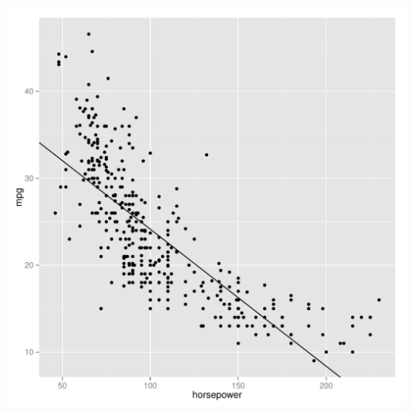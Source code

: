\documentclass{article}\usepackage[]{graphicx}\usepackage[]{color}
\makeatletter
\def\maxwidth{ %
  \ifdim\Gin@nat@width>\linewidth
    \linewidth
  \else
    \Gin@nat@width
  \fi
}
\newenvironment{knitrout}{}{} %
\makeatother
\begin{document}
\begin{enumerate}[(a)]
\begin{knitrout}
\includegraphics[width=\maxwidth]{figure/unnamed-chunk-8-1} 

\end{knitrout}


\end{enumerate}
\end{document}
